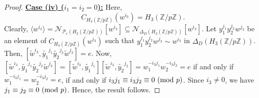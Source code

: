 \documentclass[12pt,a4paper]{article}
\begin{document}
\begin{proof}
\vspace{.3cm}
\noindent\underline{\textbf{Case (iv) ($i_1=i_2=0$):}} Here, \[C_{H_3(\mathbb{Z}/p\mathbb{Z})}(w^{i_3})=H_3(\mathbb{Z}/p\mathbb{Z}).\] Clearly, $\langle w^{i_3}\rangle=\mathcal{N}_{\mathcal{P}_e(H_3(\mathbb{Z}/p\mathbb{Z}))}[w^{i_3}]\subseteq \mathcal{N}_{\Delta_D(H_3(\mathbb{Z}/p\mathbb{Z}))}[w^{i_3}]$. Let $y_1^{j_1}y_2^{j_2}w^{j_3}$ be an element of $C_{H_3(\mathbb{Z}/p\mathbb{Z})}(w^{i_3})$ such that $y_1^{j_1}y_2^{j_2}w^{j_3}\sim w^{i_3}$ in $\Delta_D(H_3(\mathbb{Z}/p\mathbb{Z}))$. Then, $[\tilde{w}^{i_3},\tilde{y_1}^{j_1}\tilde{y_2}^{j_2}\tilde{w}^{j_3}]=e$. Now, $[\tilde{w}^{i_3},\tilde{y_1}^{j_1}\tilde{y_2}^{j_2}\tilde{w}^{j_3}]=[\tilde{w}^{i_3},\tilde{y_1}^{j_1}][\tilde{w}^{i_3},\tilde{y_2}^{j_2}]=w_1^{-i_3j_1}w_2^{-i_3j_2}=e$ if and only if $w_1^{-i_3j_1}=w_2^{-i_3j_2}=e$, if and only if $i_3j_1\equiv i_3j_2\equiv 0~({\rm mod}~p)$. Since $i_3\neq 0$, we have $j_1\equiv j_2\equiv 0~({\rm mod}~p)$. Hence, the result follows.
\end{proof}
\end{document}
